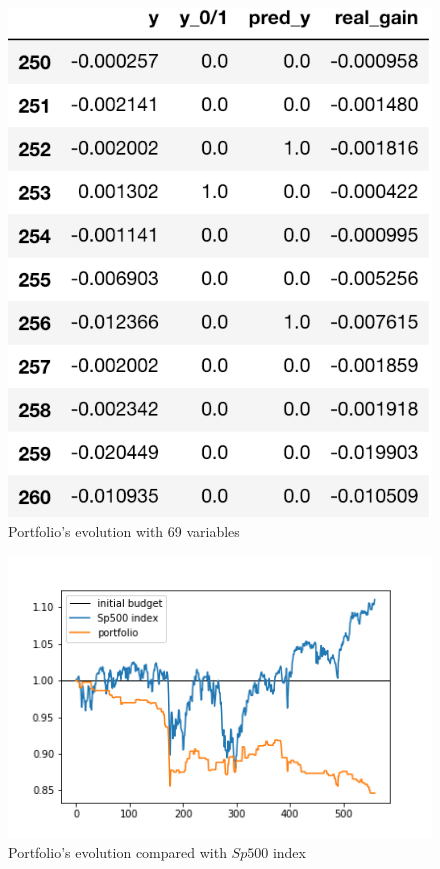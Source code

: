 \documentclass{article}%
\begin{document}
  \begin{figure}[h!]
  \centering
  \includegraphics[scale=0.55]{act_port_log.png}
  \caption{Portfolio's evolution with 69 variables}
  \label{portfolio_table_logit}
  \end{figure}
  
      \begin{figure}[h!]
  \centering
  \includegraphics[scale=0.6]{act_portfolio_logit.png}
  \caption{Portfolio's evolution compared with $Sp500$ index}
  \label{portfolio_graph_logit}
  \end{figure}
\end{document}
